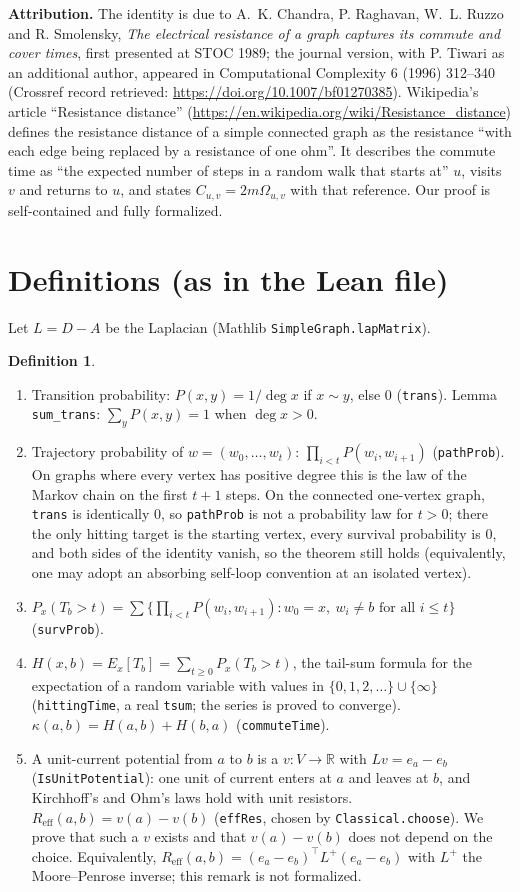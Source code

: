 \documentclass[11pt]{article}
\theoremstyle{definition}
\newtheorem{definition}[theorem]{Definition}
\newcommand{\Reff}{R_{\mathrm{eff}}}
\begin{document}
\textbf{Attribution.} The identity is due to A.~K. Chandra, P. Raghavan, W.~L. Ruzzo and
R. Smolensky, \emph{The electrical resistance of a graph captures its commute and cover times},
first presented at STOC 1989; the journal version, with P. Tiwari as an additional author, appeared in
Computational Complexity 6 (1996) 312--340 (Crossref record retrieved:
\url{https://doi.org/10.1007/bf01270385}). Wikipedia's article
``Resistance distance'' (\url{https://en.wikipedia.org/wiki/Resistance_distance}) defines the resistance distance of a simple connected graph as the resistance
``with each edge being replaced by a resistance of one ohm''. It describes the commute time as ``the
expected number of steps in a random walk that starts at'' $u$, visits $v$ and returns to $u$, and
states $C_{u,v}=2m\Omega_{u,v}$ with that reference. Our proof is self-contained and fully
formalized.

\section{Definitions (as in the Lean file)}

Let $L=D-A$ be the Laplacian (Mathlib \texttt{SimpleGraph.lapMatrix}).
\begin{definition}
\begin{enumerate}
\item Transition probability: $P(x,y)=1/\deg x$ if $x\sim y$, else $0$ (\texttt{trans}). Lemma
\texttt{sum\_trans}: $\sum_y P(x,y)=1$ when $\deg x>0$.
\item Trajectory probability of $w=(w_0,\dots,w_t)$: $\prod_{i<t}P(w_i,w_{i+1})$
(\texttt{pathProb}). On graphs where every vertex has positive degree this is the law of the
Markov chain on the first $t+1$ steps. On the connected one-vertex graph, \texttt{trans} is
identically $0$, so \texttt{pathProb} is not a probability law for $t>0$; there the only hitting
target is the starting vertex, every survival probability is $0$, and both sides of the identity
vanish, so the theorem still holds (equivalently, one may adopt an absorbing self-loop convention
at an isolated vertex).
\item $P_x(T_b>t)=\sum\{\prod_{i<t}P(w_i,w_{i+1}) : w_0=x,\ w_i\ne b \text{ for all } i\le t\}$
(\texttt{survProb}).
\item $H(x,b)=E_x[T_b]=\sum_{t\ge 0}P_x(T_b>t)$, the tail-sum formula for the expectation of a
random variable with values in $\{0,1,2,\dots\}\cup\{\infty\}$ (\texttt{hittingTime}, a real
\texttt{tsum}; the series is proved to converge). $\kappa(a,b)=H(a,b)+H(b,a)$
(\texttt{commuteTime}).
\item A unit-current potential from $a$ to $b$ is a $v:V\to\mathbb R$ with $Lv=e_a-e_b$
(\texttt{IsUnitPotential}): one unit of current enters at $a$ and leaves at $b$, and Kirchhoff's
and Ohm's laws hold with unit resistors. $\Reff(a,b)=v(a)-v(b)$ (\texttt{effRes}, chosen by
\texttt{Classical.choose}). We prove that such a $v$ exists and that $v(a)-v(b)$ does not depend on
the choice. Equivalently, $\Reff(a,b)=(e_a-e_b)^{\top}L^{+}(e_a-e_b)$ with $L^+$ the Moore--Penrose
inverse; this remark is not formalized.
\end{enumerate}
\end{definition}
\end{document}
